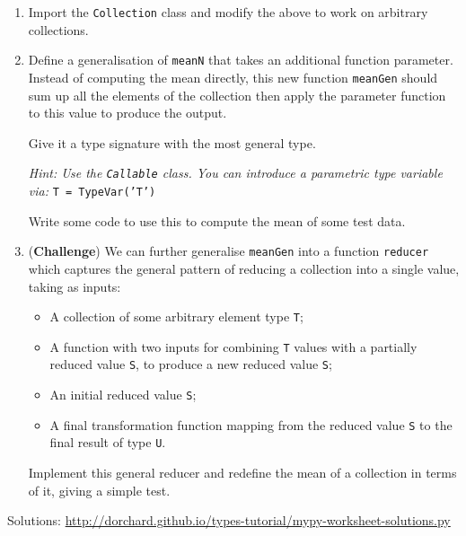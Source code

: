 \documentclass{article}
\begin{document}
\begin{enumerate}[resume]
\item Import the \texttt{Collection} class and modify the above to work on arbitrary
  collections.

\item Define a generalisation of
  \texttt{meanN} that takes an additional function parameter.
  Instead of computing the mean directly, this new function
  \texttt{meanGen} should
  sum up all the elements of the collection then apply
  the parameter function to this value to produce the output.

  Give it a type signature with
  the most general type.

  \textit{Hint: Use the \texttt{Callable} class.
    You can introduce a parametric type variable
    via: } \texttt{T = TypeVar('T')}

  Write some code to use this to compute the mean of some test data.

\item (\textbf{Challenge}) We can further generalise \texttt{meanGen} into a
  function \texttt{reducer} which captures the general pattern
  of reducing a collection into a single value, taking as inputs:
  \begin{itemize}
  \item A collection of some arbitrary element type \texttt{T};
  \item A function with two inputs for combining \texttt{T} values with
    a partially reduced value \texttt{S}, to produce a new reduced value \texttt{S};
  \item An initial reduced value \texttt{S};
  \item A final transformation function mapping from the reduced value \texttt{S} to
    the final result of type \texttt{U}.
  \end{itemize}
  Implement this general reducer and redefine the mean of a collection
  in terms of it, giving a simple test.
\end{enumerate}
%
Solutions: \url{http://dorchard.github.io/types-tutorial/mypy-worksheet-solutions.py}
\end{document}
